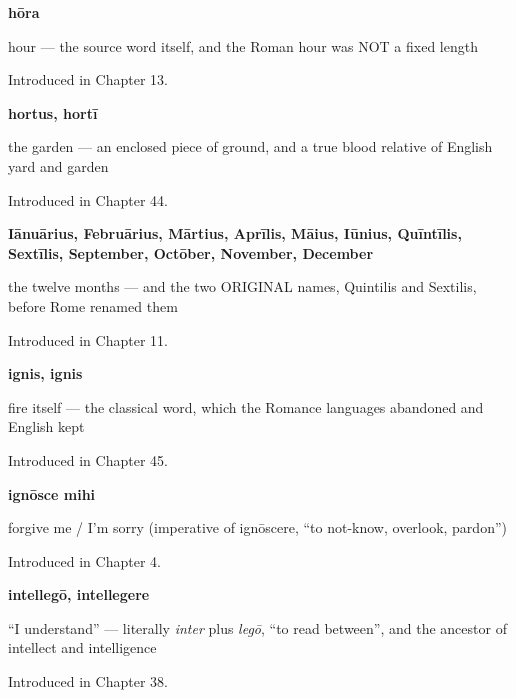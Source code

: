 \noindent\begin{minipage}[t]{\linewidth}
\raggedright
\textbf{hōra}\par
\small hour — the source word itself, and the Roman hour was NOT a fixed length\par
\footnotesize Introduced in Chapter 13.
\end{minipage}\par\medskip

\noindent\begin{minipage}[t]{\linewidth}
\raggedright
\textbf{hortus, hortī}\par
\small the garden — an enclosed piece of ground, and a true blood relative of English yard and garden\par
\footnotesize Introduced in Chapter 44.
\end{minipage}\par\medskip

\noindent\begin{minipage}[t]{\linewidth}
\raggedright
\textbf{Iānuārius, Februārius, Mārtius, Aprīlis, Māius, Iūnius, Quīntīlis, Sextīlis, September, Octōber, November, December}\par
\small the twelve months — and the two ORIGINAL names, Quintilis and Sextilis, before Rome renamed them\par
\footnotesize Introduced in Chapter 11.
\end{minipage}\par\medskip

\noindent\begin{minipage}[t]{\linewidth}
\raggedright
\textbf{ignis, ignis}\par
\small fire itself — the classical word, which the Romance languages abandoned and English kept\par
\footnotesize Introduced in Chapter 45.
\end{minipage}\par\medskip

\noindent\begin{minipage}[t]{\linewidth}
\raggedright
\textbf{ignōsce mihi}\par
\small forgive me / I'm sorry (imperative of ignōscere, \textquotedblleft{}to not-know, overlook, pardon\textquotedblright{})\par
\footnotesize Introduced in Chapter 4.
\end{minipage}\par\medskip

\noindent\begin{minipage}[t]{\linewidth}
\raggedright
\textbf{intellegō, intellegere}\par
\small \textquotedblleft{}I understand\textquotedblright{} — literally \emph{inter} plus \emph{legō}, \textquotedblleft{}to read between\textquotedblright{}, and the ancestor of intellect and intelligence\par
\footnotesize Introduced in Chapter 38.
\end{minipage}\par\medskip

